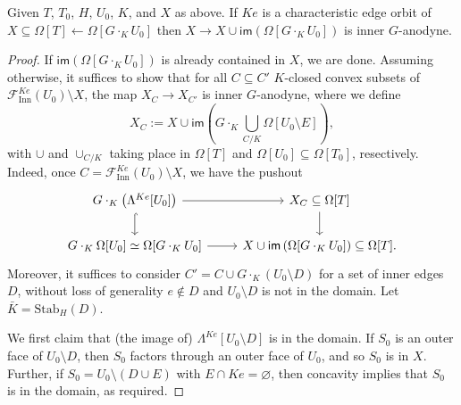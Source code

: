 \documentclass[a4paper,10pt,draft]{article}%
\numberwithin{equation}{section}%
\begin{document}
\begin{proposition}
      \label{CHAR_HORN_PROP}
      Given $T$, $T_0$, $H$, $U_0$, $K$, and $X$ as above.
      If $K e$ is a characteristic edge orbit of $X \subseteq \Omega[T] \leftarrow \Omega[G \cdot_K U_0]$
      then $X \to X \cup \mathsf{im}\left(\Omega[G \cdot_K U_0] \right)$ is inner $G$-anodyne.
\end{proposition}
\begin{proof}
      If $\mathsf{im}(\Omega[G \cdot_K U_0])$ is already contained in $X$, we are done.
      Assuming otherwise, it suffices to show that for all
      $C \subseteq C'$ $K$-closed convex subsets of $\mathscr{F}_{\mathrm{Inn}}^{K e}(U_0) \setminus X$, the map
      $X_C \to X_{C'}$ is inner $G$-anodyne, where we define
      \begin{equation}
            X_C := X \cup \mathsf{im} \left( G \cdot_K \mathop{\bigcup}\limits_{C/K} \Omega[U_0 \setminus E] \right),
      \end{equation}
      with $\cup$ and $\cup_{C/K}$ taking place in $\Omega[T]$ and $\Omega[U_0] \subseteq \Omega[T_0]$, resectively.
      Indeed, once $C = \mathscr{F}_{\mathrm{Inn}}^{K e}(U_0) \setminus X$, we have the pushout
      \begin{equation}
            \begin{tikzcd}
                  G \cdot_K \left( \Lambda^{K e}[U_0] \right) \arrow[d, hookrightarrow] \arrow[r]
                  &
                  X_C \subseteq \Omega[T] \arrow[d]
                  \\
                  G \cdot_K \Omega[U_0] \simeq \Omega[G \cdot_K U_0] \arrow[r]
                  &
                  X \cup \mathsf{im}\left(\Omega[G \cdot_K U_0]\right) \subseteq \Omega[T].
            \end{tikzcd}
      \end{equation}
      Moreover, it suffices to consider $C' = C \cup G\cdot_K(U_0 \setminus D)$ for a set of inner edges $D$,
      without loss of generality $e \not\in D$ and $U_0 \setminus D$ is not in the domain.
      Let $\bar K = \mathrm{Stab}_H(D)$.

      We first claim that (the image of) $\Lambda^{K e}[U_0 \setminus D]$ is in the domain.
      If $S_0$ is an outer face of $U_0 \setminus D$, then
      $S_0$ factors through an outer face of $U_0$, and so $S_0$ is in $X$.
      Further, if $S_0 = U_0 \setminus (D \cup E)$ with $E \cap K e = \varnothing$,
      then concavity implies that $S_0$ is in the domain, as required.


\end{proof}
\end{document}
